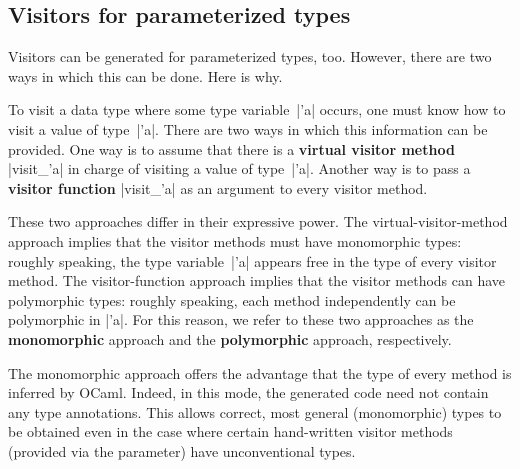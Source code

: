 \documentclass[11pt,a4paper,twoside]{article}
\renewcommand{\emph}[1]{\textbf{#1}}
\begin{document}

\subsection{Visitors for parameterized types}
\label{sec:intro:parameterized}


Visitors can be generated for parameterized types, too. However, there are two
ways in which this can be done. Here is why.

To visit a data type where some type variable~\oc|'a| occurs, one must know
how to visit a value of type~\oc|'a|.
%
%
There are two ways in which this information can be provided. One way is to
assume that there is a \emph{virtual visitor method} \oc|visit_'a| in charge
of visiting a value of type~\oc|'a|. Another way is to pass a \emph{visitor
  function} \oc|visit_'a| as an argument to every visitor method.


These two approaches differ in their expressive power. The
virtual-visitor-method approach implies that the visitor methods must have
monomorphic types: roughly speaking, the type variable~\oc|'a|
appears free in the type of every visitor method.
The visitor-function approach implies that the visitor methods can have
polymorphic types: roughly speaking, each method independently
can be polymorphic in \oc|'a|.
For this reason, we refer to these two approaches as the \emph{monomorphic}
approach and the \emph{polymorphic} approach, respectively.

The monomorphic approach offers the advantage that the type of every method is
inferred by OCaml. Indeed, in this mode, the generated code need not contain
any type annotations. This allows correct, most general (monomorphic) types to
be obtained even in the case where certain hand-written visitor methods
(provided via the \ancestors parameter) have unconventional types.
%
\end{document}
